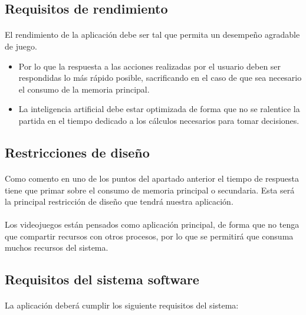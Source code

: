 \subsection{Requisitos de rendimiento}

\paragraph{}
El rendimiento de la aplicación debe ser tal que permita un desempeño agradable de juego. 

\begin{itemize}
    \item Por lo que la respuesta a las acciones realizadas por el usuario deben ser respondidas lo más rápido posible,
    sacrificando en el caso de que sea necesario el consumo de la memoria principal.
    
    \item La inteligencia artificial debe estar optimizada de forma que no se ralentice la partida en el tiempo dedicado a los
    cálculos necesarios para tomar decisiones.
\end{itemize}
    

\subsection{Restricciones de diseño}

\paragraph{}
Como comento en uno de los puntos del apartado anterior el tiempo de respuesta tiene que primar sobre el consumo de 
memoria principal o secundaria. Esta será la principal restricción de diseño que tendrá nuestra aplicación.

\paragraph{}
Los videojuegos están pensados como aplicación principal, de forma que no tenga que compartir recursos con otros procesos,
por lo que se permitirá que consuma muchos recursos del sistema.

\subsection{Requisitos del sistema software}

\paragraph{}
La aplicación deberá cumplir los siguiente requisitos del sistema:

